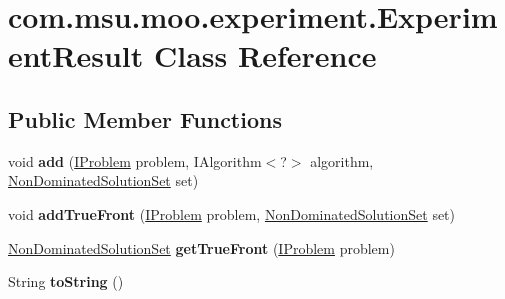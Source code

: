 \hypertarget{classcom_1_1msu_1_1moo_1_1experiment_1_1ExperimentResult}{\section{com.\-msu.\-moo.\-experiment.\-Experiment\-Result Class Reference}
\label{classcom_1_1msu_1_1moo_1_1experiment_1_1ExperimentResult}
}
\subsection*{Public Member Functions}
\begin{DoxyCompactItemize}
\item 
\hypertarget{classcom_1_1msu_1_1moo_1_1experiment_1_1ExperimentResult_a225f98f23ab87253bd91f037517aa43d}{void {\bfseries add} (\hyperlink{interfacecom_1_1msu_1_1moo_1_1model_1_1interfaces_1_1IProblem}{I\-Problem} problem, I\-Algorithm$<$?$>$ algorithm, \hyperlink{classcom_1_1msu_1_1moo_1_1model_1_1solution_1_1NonDominatedSolutionSet}{Non\-Dominated\-Solution\-Set} set)}\label{classcom_1_1msu_1_1moo_1_1experiment_1_1ExperimentResult_a225f98f23ab87253bd91f037517aa43d}

\item 
\hypertarget{classcom_1_1msu_1_1moo_1_1experiment_1_1ExperimentResult_ad5e42824165c0405debca2182e9cd8a6}{void {\bfseries add\-True\-Front} (\hyperlink{interfacecom_1_1msu_1_1moo_1_1model_1_1interfaces_1_1IProblem}{I\-Problem} problem, \hyperlink{classcom_1_1msu_1_1moo_1_1model_1_1solution_1_1NonDominatedSolutionSet}{Non\-Dominated\-Solution\-Set} set)}\label{classcom_1_1msu_1_1moo_1_1experiment_1_1ExperimentResult_ad5e42824165c0405debca2182e9cd8a6}

\item 
\hypertarget{classcom_1_1msu_1_1moo_1_1experiment_1_1ExperimentResult_afb01e5643dd559c8e8d59fa96d691572}{\hyperlink{classcom_1_1msu_1_1moo_1_1model_1_1solution_1_1NonDominatedSolutionSet}{Non\-Dominated\-Solution\-Set} {\bfseries get\-True\-Front} (\hyperlink{interfacecom_1_1msu_1_1moo_1_1model_1_1interfaces_1_1IProblem}{I\-Problem} problem)}\label{classcom_1_1msu_1_1moo_1_1experiment_1_1ExperimentResult_afb01e5643dd559c8e8d59fa96d691572}

\item 
\hypertarget{classcom_1_1msu_1_1moo_1_1experiment_1_1ExperimentResult_a4d691c059cd70f300640f4d25000e906}{String {\bfseries to\-String} ()}\label{classcom_1_1msu_1_1moo_1_1experiment_1_1ExperimentResult_a4d691c059cd70f300640f4d25000e906}


\end{DoxyCompactItemize}
